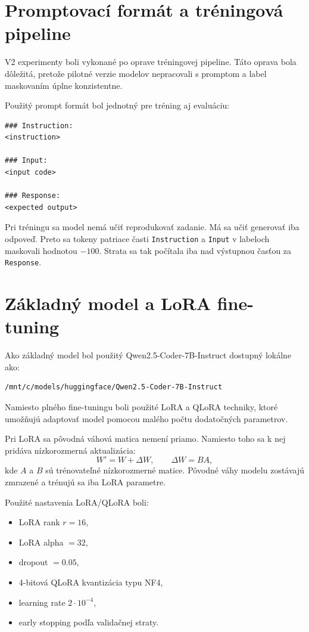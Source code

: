 \documentclass[11pt,a4paper]{article}
\begin{document}
\section{Promptovací formát a tréningová pipeline}

V2 experimenty boli vykonané po oprave tréningovej pipeline. Táto oprava bola dôležitá, pretože pilotné verzie modelov nepracovali s promptom a label maskovaním úplne konzistentne.

Použitý prompt formát bol jednotný pre tréning aj evaluáciu:

\begin{lstlisting}
### Instruction:
<instruction>

### Input:
<input code>

### Response:
<expected output>
\end{lstlisting}

Pri tréningu sa model nemá učiť reprodukovať zadanie. Má sa učiť generovať iba odpoveď. Preto sa tokeny patriace časti \texttt{Instruction} a \texttt{Input} v labeloch maskovali hodnotou $-100$. Strata sa tak počítala iba nad výstupnou časťou za \texttt{Response}.



\section{Základný model a LoRA fine-tuning}

Ako základný model bol použitý Qwen2.5-Coder-7B-Instruct dostupný lokálne ako:

\begin{lstlisting}
/mnt/c/models/huggingface/Qwen2.5-Coder-7B-Instruct
\end{lstlisting}

Namiesto plného fine-tuningu boli použité LoRA a QLoRA techniky, ktoré umožňujú adaptovať model pomocou malého počtu dodatočných parametrov.

Pri LoRA sa pôvodná váhová matica nemení priamo. Namiesto toho sa k nej pridáva nízkorozmerná aktualizácia:
\begin{equation}
W' = W + \Delta W,
\qquad
\Delta W = BA,
\end{equation}
kde $A$ a $B$ sú trénovateľné nízkorozmerné matice. Pôvodné váhy modelu zostávajú zmrazené a trénujú sa iba LoRA parametre.

Použité nastavenia LoRA/QLoRA boli:
\begin{itemize}
\item LoRA rank $r = 16$,
\item LoRA alpha $= 32$,
\item dropout $= 0.05$,
\item 4-bitová QLoRA kvantizácia typu NF4,
\item learning rate $2 \cdot 10^{-4}$,
\item early stopping podľa validačnej straty.
\end{itemize}
\end{document}
